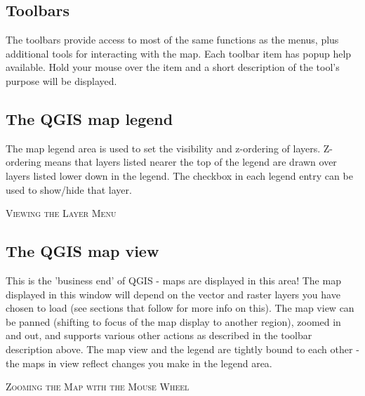 \subsection{Toolbars}
The toolbars provide access to most of the same functions as the menus, plus
additional tools for interacting with the map. Each toolbar item has popup
help available. Hold your mouse over the item and a short description of the
tool's purpose will be displayed. %

\subsection{The QGIS map legend}
The map legend area is used to set the visibility and z-ordering of layers.
Z-ordering means that layers listed nearer the top of the legend are drawn
over layers listed lower down in the legend. The checkbox in each legend entry
can be used to show/hide that layer.
\begin{Tip} \caption{\textsc{Viewing the Layer Menu}}
\end{Tip}

\subsection{The QGIS map view}
This is the 'business end' of QGIS - maps are displayed in this area! The map
displayed in this window will depend on the vector and raster layers you have
chosen to load (see sections that follow for more info on this). The map view
can be panned (shifting to focus of the map display to another region), zoomed
in and out, and supports various other actions as described in the toolbar
description above.  The map view and the legend are tightly bound to each
other - the maps in view reflect changes you make in the legend area.  
\begin{Tip}\caption{\textsc{Zooming the Map with the Mouse
Wheel}}
\end{Tip}
